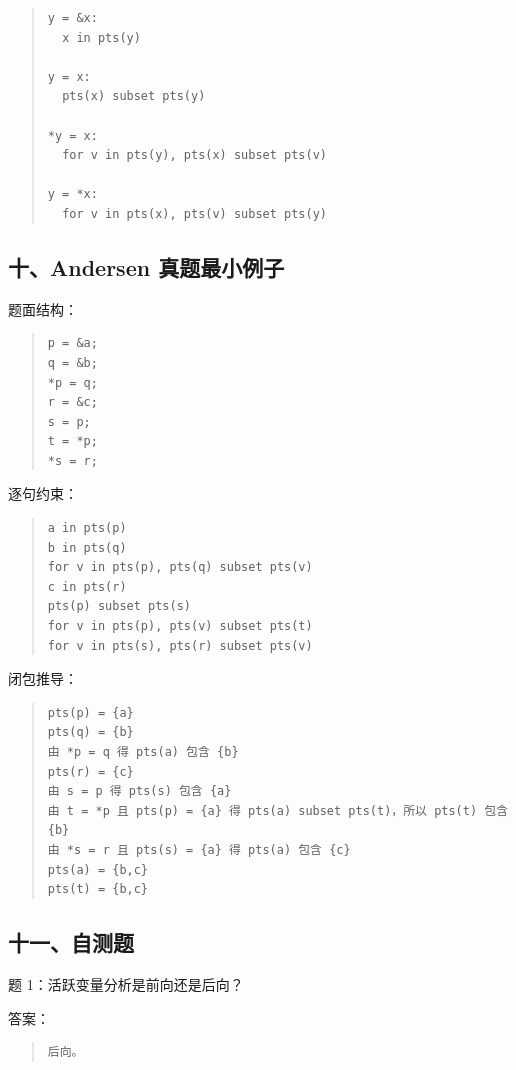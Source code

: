 \documentclass[UTF8,zihao=-4]{ctexart}
\begin{document}
\begin{quote}
\footnotesize
\begin{verbatim}
y = &x:
  x in pts(y)

y = x:
  pts(x) subset pts(y)

*y = x:
  for v in pts(y), pts(x) subset pts(v)

y = *x:
  for v in pts(x), pts(v) subset pts(y)
\end{verbatim}
\end{quote}


\subsection{十、Andersen 真题最小例子}


题面结构：


\begin{quote}
\footnotesize
\begin{verbatim}
p = &a;
q = &b;
*p = q;
r = &c;
s = p;
t = *p;
*s = r;
\end{verbatim}
\end{quote}


逐句约束：


\begin{quote}
\footnotesize
\begin{verbatim}
a in pts(p)
b in pts(q)
for v in pts(p), pts(q) subset pts(v)
c in pts(r)
pts(p) subset pts(s)
for v in pts(p), pts(v) subset pts(t)
for v in pts(s), pts(r) subset pts(v)
\end{verbatim}
\end{quote}


闭包推导：


\begin{quote}
\footnotesize
\begin{verbatim}
pts(p) = {a}
pts(q) = {b}
由 *p = q 得 pts(a) 包含 {b}
pts(r) = {c}
由 s = p 得 pts(s) 包含 {a}
由 t = *p 且 pts(p) = {a} 得 pts(a) subset pts(t)，所以 pts(t) 包含 {b}
由 *s = r 且 pts(s) = {a} 得 pts(a) 包含 {c}
pts(a) = {b,c}
pts(t) = {b,c}
\end{verbatim}
\end{quote}


\subsection{十一、自测题}


题 1：活跃变量分析是前向还是后向？


答案：


\begin{quote}
\footnotesize
\begin{verbatim}
后向。
\end{verbatim}
\end{quote}
\end{document}
